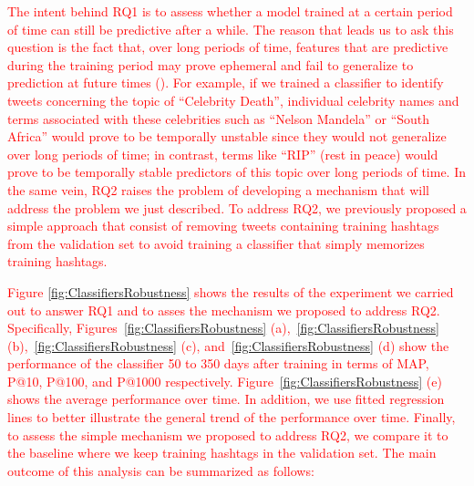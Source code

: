 \textcolor{red}{The intent behind RQ1 is to assess whether a model trained at a certain period of time can still be predictive after a while. The reason that leads us to ask this question is the fact that, over long periods of time, features that are predictive during the training period may prove ephemeral and fail to generalize to prediction at future times (\cite{Wang2019}). For example, if we trained a classifier to identify tweets concerning the topic of “Celebrity Death”, individual celebrity names and terms associated with these celebrities such as “Nelson Mandela” or “South Africa” would prove to be temporally unstable since they would not generalize over long periods of time; in contrast, terms like “RIP” (rest in peace) would prove to be temporally stable predictors of this topic over long periods of time. In the same vein, RQ2 raises the problem of developing a mechanism that will address the problem we just described. To address RQ2, we previously proposed a simple approach that consist of removing tweets containing training hashtags from the validation set to avoid training a classifier that simply memorizes training hashtags.}

\textcolor{red}{Figure \ref{fig:ClassifiersRobustness} shows the results of the experiment we carried out to answer RQ1 and to asses the mechanism we proposed to address RQ2. Specifically, Figures~\ref{fig:ClassifiersRobustness} (a),~\ref{fig:ClassifiersRobustness} (b),~\ref{fig:ClassifiersRobustness} (c), and~\ref{fig:ClassifiersRobustness} (d) show the performance of the classifier 50 to 350 days after training in terms of MAP, P@10, P@100, and P@1000 respectively. Figure~\ref{fig:ClassifiersRobustness} (e) shows the average performance over time.
In addition, we use fitted regression lines to better illustrate the general trend of the performance over time. Finally, to assess the simple mechanism we proposed to address RQ2, we compare it to the baseline where we keep training hashtags in the validation set. The main outcome of this analysis can be summarized as follows:
}

